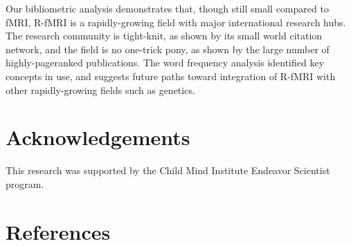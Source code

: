 \documentclass[5p]{elsarticle}
\begin{document}
Our bibliometric analysis demonstrates that, though still small compared
to fMRI, R-fMRI is a rapidly-growing field with major international
research hubs.  The research community is tight-knit, as shown by its
small world citation network, and the field is no one-trick pony, as shown
by the large number of highly-pageranked publications. The word frequency
analysis identified key concepts in use, and suggests future paths toward
integration of R-fMRI with other rapidly-growing fields such as genetics.

\section{Acknowledgements} This research was supported by the Child Mind
Institute Endeavor Scientist program.

{
\section*{References}

 
}
\end{document}
